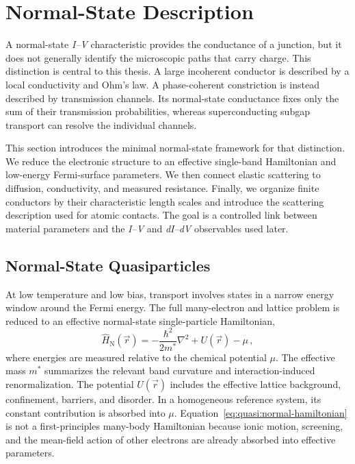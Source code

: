 \newpage
\section{Normal-State Description}
\label{sec:normal-state}

    A normal-state \textit{I--V} characteristic provides the conductance of a junction, but it does not generally identify the microscopic paths that carry charge. This distinction is central to this thesis. A large incoherent conductor is described by a local conductivity and Ohm's law. A phase-coherent constriction is instead described by transmission channels. Its normal-state conductance fixes only the sum of their transmission probabilities, whereas superconducting subgap transport can resolve the individual channels.

    This section introduces the minimal normal-state framework for that distinction. We reduce the electronic structure to an effective single-band Hamiltonian and low-energy Fermi-surface parameters. We then connect elastic scattering to diffusion, conductivity, and measured resistance. Finally, we organize finite conductors by their characteristic length scales and introduce the scattering description used for atomic contacts. The goal is a controlled link between material parameters and the \textit{I--V} and \textit{dI--dV} observables used later. \cite{gross_festkorperphysik_2014}

    \subsection{Normal-State Quasiparticles}
    \label{subsec:quasi:normal-state-quasiparticles}

        At low temperature and low bias, transport involves states in a narrow energy window around the Fermi energy. The full many-electron and lattice problem is reduced to an effective normal-state single-particle Hamiltonian,
        \begin{equation}
            \hat{H}_\mathrm{N}(\vec{r})
            = -\frac{\hbar^2}{2m^\ast}\nabla^2
            + U(\vec{r})-\mu\,,
            \label{eq:quasi:normal-hamiltonian}
        \end{equation}
        where energies are measured relative to the chemical potential $\mu$. The effective mass $m^\ast$ summarizes the relevant band curvature and interaction-induced renormalization. The potential $U(\vec{r})$ includes the effective lattice background, confinement, barriers, and disorder. In a homogeneous reference system, its constant contribution is absorbed into $\mu$. Equation~\eqref{eq:quasi:normal-hamiltonian} is not a first-principles many-body Hamiltonian because ionic motion, screening, and the mean-field action of other electrons are already absorbed into effective parameters. \cite{gross_festkorperphysik_2014}

